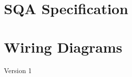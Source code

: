 \documentclass[fleqn,twoside]{article}
\begin{document}


\newpage





\newpage
\appendix
\section{SQA Specification}
\label{app:sqa_specs}


\begin{minipage}[b]{0.9\linewidth}
	
\end{minipage}




\newpage

\section{Wiring Diagrams}
\label{app:wiring}

Version 1
\begin{minipage}[b]{0.9\linewidth}
	
\end{minipage}

%





\end{document}
